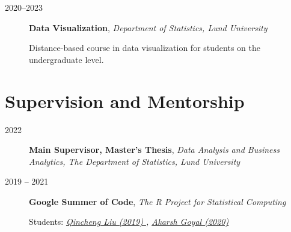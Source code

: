 \documentclass[
  10pt,
  headsepline=true,
  english,
  DIV=12
]{scrartcl}
\renewcommand*{%
  \mkbibnamegiven
}[1]{\ifitemannotation{highlight}{\textbf{#1}}{#1}}
\renewcommand*{%
  \mkbibnamefamily
}[1]{\ifitemannotation{highlight}{\textbf{#1}}{#1}}
\begin{document}
\begin{description}
  \item[2020--2023]{
              \textbf{Data Visualization}, \emph{Department of Statistics, Lund
                University}

              Distance-based course in data visualization for students on
              the undergraduate level.
        }
\end{description}

\section{Supervision and Mentorship}

\begin{description}
  \item[2022] {
    \textbf{Main Supervisor, Master's Thesis}, \emph{Data Analysis and
      Business Analytics, The Department of Statistics, Lund University}

    }
    \item[2019 -- 2021]{
                \textbf{Google Summer of Code}, \emph{The R Project for Statistical Computing}

                Students:
                \emph{
                  \href{
                    https://summerofcode.withgoogle.com/archive/2019/projects/4654960430546944/
                  }{
                    Qincheng Liu (2019)
                  },
                  \href{
                    https://summerofcode.withgoogle.com/dashboard/project/5459519376719872/overview
                  }{
                    Akarsh Goyal (2020)
                  }
                } }


\end{description}
\end{document}
